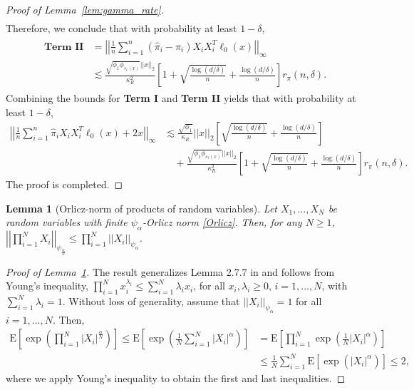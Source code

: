 \documentclass[ejsv2,noshowframe]{imsart}
\theoremstyle{plain}
\newtheorem{lemma}[theorem]{Lemma}
\theoremstyle{definition}
\theoremstyle{remark}
\newcommand{\norm}[1]{\left|\left| #1 \right|\right|}
\renewcommand{\hat}{\widehat}
\begin{document}
\begin{proof}[Proof of Lemma~\ref{lem:gamma_rate}]
\begin{align*}
	\end{align*} 
	Therefore, we conclude that with probability at least $1-\delta$,
	\begin{align}
		\label{dual_para_term_II}
		\begin{split}
			\textbf{Term II} &= \norm{\frac{1}{n}\sum_{i=1}^n \left(\hat{\pi}_i - \pi_i\right) X_i X_i^T \ell_0(x)}_{\infty}\\
			&\lesssim \frac{\sqrt{\phi_1 \phi_{s_{\ell}(x)}}\norm{x}_2}{\kappa_R^2} \left[1 + \sqrt{\frac{\log(d/\delta)}{n}} + \frac{\log(d/\delta)}{n}\right] r_{\pi}(n,\delta).
		\end{split}
	\end{align}
	Combining the bounds for \textbf{Term I} and \textbf{Term II} yields that with probability at least $1-\delta$,
	\begin{align*}
		\norm{\frac{1}{n}\sum_{i=1}^n \hat{\pi}_i X_i X_i^T \ell_0(x) + 2x}_{\infty} &\lesssim \frac{\sqrt{\phi_1}}{\kappa_R}\norm{x}_2 \left[\sqrt{\frac{\log(d/\delta)}{n}} + \frac{\log(d/\delta)}{n} \right]\\
		&\quad + \frac{\sqrt{\phi_1 \phi_{s_{\ell}(x)}}\norm{x}_2}{\kappa_R^2} \left[1 + \sqrt{\frac{\log(d/\delta)}{n}} + \frac{\log(d/\delta)}{n}\right] r_{\pi}(n,\delta).
	\end{align*}
	The proof is completed.
\end{proof}

\vspace{3mm}

\begin{lemma}[Orlicz-norm of products of random variables]
	\label{lem:Orlicz_prod}
	Let $X_1,...,X_N$ be random variables with finite $\psi_{\alpha}$-Orlicz norm \eqref{Orlicz}. Then, for any $N\geq 1$, $\norm{\prod_{i=1}^N X_i}_{\psi_{\frac{\alpha}{N}}} \leq \prod_{i=1}^N \norm{X_i}_{\psi_{\alpha}}$.
\end{lemma}

\begin{proof}[Proof of Lemma~\ref{lem:Orlicz_prod}]
	The result generalizes Lemma 2.7.7 in \cite{vershynin2018high} and follows from Young's inequality, $\prod_{i=1}^N x_i^{\lambda_i} \leq \sum_{i=1}^N \lambda_i x_i$, for all $x_i,\lambda_i\geq 0$, $i=1,...,N$, with $\sum_{i=1}^N \lambda_i=1$. Without loss of generality, assume that $\norm{X_i}_{\psi_{\alpha}} =1$ for all $i=1,...,N$. Then,
	\begin{align*}
		\mathrm{E}\left[\exp\left(\prod_{i=1}^N |X_i|^{\frac{\alpha}{N}} \right)\right] \leq \mathrm{E}\left[\exp\left(\frac{1}{N} \sum_{i=1}^N |X_i|^{\alpha} \right)\right] &= \mathrm{E}\left[\prod_{i=1}^N \exp\left(\frac{1}{N} |X_i|^{\alpha}\right) \right] \\
		&\leq \frac{1}{N} \sum_{i=1}^N \mathrm{E}\left[\exp\left(|X_i|^{\alpha}\right) \right] \leq 2,
	\end{align*}
	where we apply Young's inequality to obtain the first and last inequalities.
\end{proof}
\end{document}

